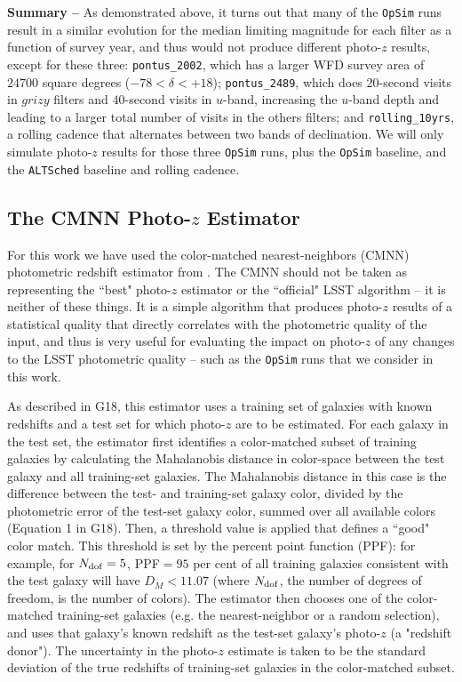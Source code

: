 {\bf Summary --} As demonstrated above, it turns out that many of the {\tt OpSim} runs result in a similar evolution for the median limiting magnitude for each filter as a function of survey year, and thus would not produce different photo-$z$ results, except for these three: {\tt pontus\_2002}, which has a larger WFD survey area of $24700$ square degrees ($-78 < \delta < +18$); {\tt pontus\_2489}, which does $20$-second visits in $grizy$ filters and $40$-second visits in $u$-band, increasing the $u$-band depth and leading to a larger total number of visits in the others filters; and {\tt rolling\_10yrs}, a rolling cadence that alternates between two bands of declination. We will only simulate photo-$z$ results for those three {\tt OpSim} runs, plus the {\tt OpSim} baseline, and the {\tt ALTSched} baseline and rolling cadence.


\subsection{The CMNN Photo-$z$ Estimator}\label{ssec:pz_exp_cmnn}

For this work we have used the color-matched nearest-neighbors (CMNN) photometric redshift estimator from \cite[][herafter G18]{2018AJ....155....1G}. The CMNN should not be taken as representing the ``best" photo-$z$ estimator or the ``official" LSST algorithm -- it is neither of these things. It is a simple algorithm that produces photo-$z$ results of a statistical quality that directly correlates with the photometric quality of the input, and thus is very useful for evaluating the impact on photo-$z$ of any changes to the LSST photometric quality -- such as the {\tt OpSim} runs that we consider in this work.

As described in G18, this estimator uses a training set of galaxies with known redshifts and a test set for which photo-$z$ are to be estimated. For each galaxy in the test set, the estimator first identifies a color-matched subset of training galaxies by calculating the Mahalanobis distance in color-space between the test galaxy and all training-set galaxies. The Mahalanobis distance in this case is the difference between the test- and training-set galaxy color, divided by the photometric error of the test-set galaxy color, summed over all available colors (Equation 1 in G18). Then, a threshold value is applied that defines a ``good" color match. This threshold is set by the percent point function (PPF): for example, for $N_{\rm dof}=5$, PPF$=95$ per cent of all training galaxies consistent with the test galaxy will have $D_M < 11.07$ (where $N_{\rm dof}$, the number of degrees of freedom, is the number of colors). The estimator then chooses one of the color-matched training-set galaxies (e.g. the nearest-neighbor or a random selection), and uses that galaxy's known redshift as the test-set galaxy's photo-$z$ (a "redshift donor"). The uncertainty in the photo-$z$ estimate is taken to be the standard deviation of the true redshifts of training-set galaxies in the color-matched subset. 

